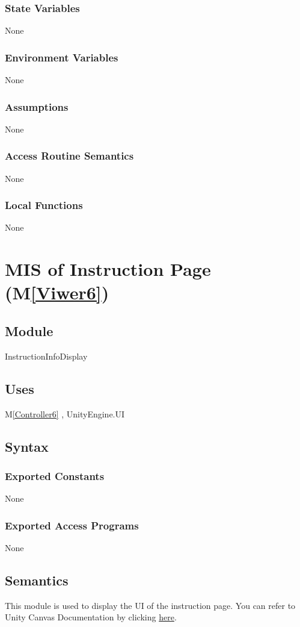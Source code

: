 \documentclass[12pt, titlepage]{article}
\newcommand{\mref}[1]{M\ref{#1}}
\begin{document}
\subsubsection{State Variables}
None
\subsubsection{Environment Variables}
None
\subsubsection{Assumptions}
None
\subsubsection{Access Routine Semantics}
None
\subsubsection{Local Functions}
None

\newpage

\section{MIS of Instruction Page (\mref{Viwer6})}

\subsection{Module}
InstructionInfoDisplay

\subsection{Uses}
\mref{Controller6} ,
UnityEngine.UI

\subsection{Syntax}
\subsubsection{Exported Constants}
None
\subsubsection{Exported Access Programs}
None

\subsection{Semantics}
This module is used to display the UI of the instruction page. 
You can refer to Unity Canvas Documentation by clicking 
\href{https://docs.unity3d.com/Packages/com.unity.ugui@1.0/manual/class-Canvas.html}{here}.
\end{document}
